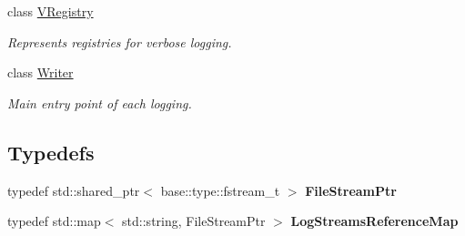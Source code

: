 \begin{DoxyCompactItemize}
class \hyperlink{classel_1_1base_1_1_v_registry}{V\+Registry}
\begin{DoxyCompactList}\small\item\em Represents registries for verbose logging. \end{DoxyCompactList}\item 
class \hyperlink{classel_1_1base_1_1_writer}{Writer}
\begin{DoxyCompactList}\small\item\em Main entry point of each logging. \end{DoxyCompactList}\end{DoxyCompactItemize}
\subsection*{Typedefs}
\begin{DoxyCompactItemize}
\item 
\mbox{\label{namespaceel_1_1base_a8b10bcfd674533f8340cd8c39fbf5233}} 
typedef std\+::shared\+\_\+ptr$<$ base\+::type\+::fstream\+\_\+t $>$ {\bfseries File\+Stream\+Ptr}
\item 
\mbox{\label{namespaceel_1_1base_af7602da9fe1d6c75985184fb0e39fd11}} 
typedef std\+::map$<$ std\+::string, File\+Stream\+Ptr $>$ {\bfseries Log\+Streams\+Reference\+Map}
\end{DoxyCompactItemize}
